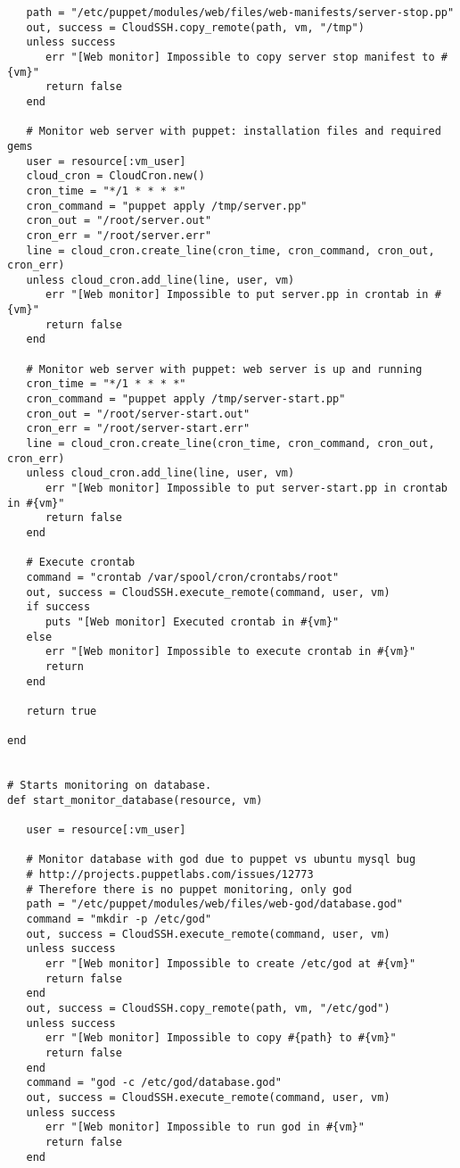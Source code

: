 \begin{lstlisting}
   path = "/etc/puppet/modules/web/files/web-manifests/server-stop.pp"
   out, success = CloudSSH.copy_remote(path, vm, "/tmp")
   unless success
      err "[Web monitor] Impossible to copy server stop manifest to #{vm}"
      return false
   end
   
   # Monitor web server with puppet: installation files and required gems
   user = resource[:vm_user]
   cloud_cron = CloudCron.new()
   cron_time = "*/1 * * * *"
   cron_command = "puppet apply /tmp/server.pp"
   cron_out = "/root/server.out"
   cron_err = "/root/server.err"
   line = cloud_cron.create_line(cron_time, cron_command, cron_out, cron_err)
   unless cloud_cron.add_line(line, user, vm)
      err "[Web monitor] Impossible to put server.pp in crontab in #{vm}"
      return false
   end

   # Monitor web server with puppet: web server is up and running
   cron_time = "*/1 * * * *"
   cron_command = "puppet apply /tmp/server-start.pp"
   cron_out = "/root/server-start.out"
   cron_err = "/root/server-start.err"
   line = cloud_cron.create_line(cron_time, cron_command, cron_out, cron_err)
   unless cloud_cron.add_line(line, user, vm)
      err "[Web monitor] Impossible to put server-start.pp in crontab in #{vm}"
      return false
   end
   
   # Execute crontab
   command = "crontab /var/spool/cron/crontabs/root"
   out, success = CloudSSH.execute_remote(command, user, vm)
   if success
      puts "[Web monitor] Executed crontab in #{vm}"
   else
      err "[Web monitor] Impossible to execute crontab in #{vm}"
      return
   end
   
   return true

end


# Starts monitoring on database.
def start_monitor_database(resource, vm)

   user = resource[:vm_user]

   # Monitor database with god due to puppet vs ubuntu mysql bug
   # http://projects.puppetlabs.com/issues/12773
   # Therefore there is no puppet monitoring, only god
   path = "/etc/puppet/modules/web/files/web-god/database.god"
   command = "mkdir -p /etc/god"
   out, success = CloudSSH.execute_remote(command, user, vm)
   unless success
      err "[Web monitor] Impossible to create /etc/god at #{vm}"
      return false
   end
   out, success = CloudSSH.copy_remote(path, vm, "/etc/god")
   unless success
      err "[Web monitor] Impossible to copy #{path} to #{vm}"
      return false
   end
   command = "god -c /etc/god/database.god"
   out, success = CloudSSH.execute_remote(command, user, vm)
   unless success
      err "[Web monitor] Impossible to run god in #{vm}"
      return false
   end
   

\end{lstlisting}
